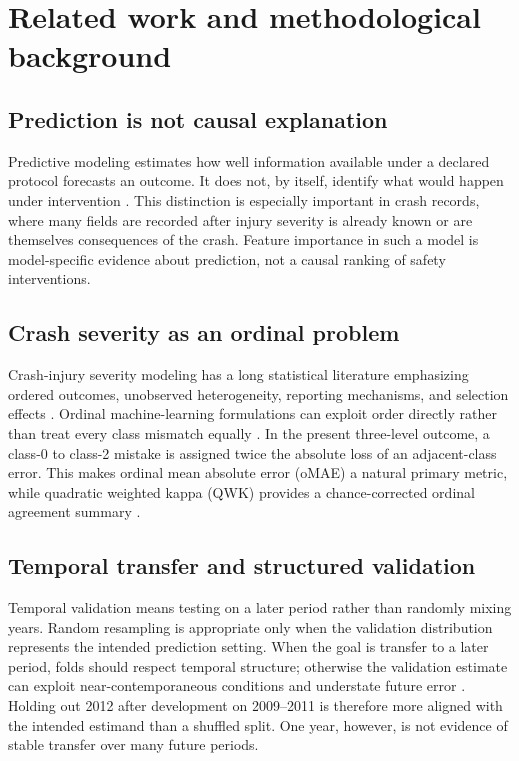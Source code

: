 \documentclass[11pt,letterpaper]{article}
\begin{document}
\section{Related work and methodological background}
\subsection{Prediction is not causal explanation}
Predictive modeling estimates how well information available under a declared protocol forecasts an outcome. It does not, by itself, identify what would happen under intervention \citep{shmueli2010}. This distinction is especially important in crash records, where many fields are recorded after injury severity is already known or are themselves consequences of the crash. Feature importance in such a model is model-specific evidence about prediction, not a causal ranking of safety interventions.

\subsection{Crash severity as an ordinal problem}
Crash-injury severity modeling has a long statistical literature emphasizing ordered outcomes, unobserved heterogeneity, reporting mechanisms, and selection effects \citep{savolainen2011}. Ordinal machine-learning formulations can exploit order directly rather than treat every class mismatch equally \citep{frankhall2001,zhu2021}. In the present three-level outcome, a class-0 to class-2 mistake is assigned twice the absolute loss of an adjacent-class error. This makes ordinal mean absolute error (oMAE) a natural primary metric, while quadratic weighted kappa (QWK) provides a chance-corrected ordinal agreement summary \citep{cohen1968}.

\subsection{Temporal transfer and structured validation}
Temporal validation means testing on a later period rather than randomly mixing years. Random resampling is appropriate only when the validation distribution represents the intended prediction setting. When the goal is transfer to a later period, folds should respect temporal structure; otherwise the validation estimate can exploit near-contemporaneous conditions and understate future error \citep{roberts2017}. Holding out 2012 after development on 2009--2011 is therefore more aligned with the intended estimand than a shuffled split. One year, however, is not evidence of stable transfer over many future periods.
\end{document}
